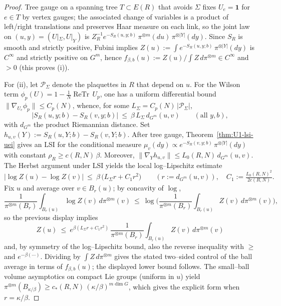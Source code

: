 \documentclass[11pt]{amsart}
\theoremstyle{plain}
\theoremstyle{definition}
\theoremstyle{remark}
\begin{document}
\begin{proof}
Tree gauge on a spanning tree $T\subset E(R)$ that avoids $\Sigma$ fixes $U_e=\mathbf 1$ for $e\in T$ by vertex gauges; the associated change of variables is a product of left/right translations and preserves Haar measure on each link, so the joint law on $(u,y)=(U|_{\Sigma},U|_Y)$ is $Z_R^{-1}e^{-S_R(u,y;b)}\,\pi^{\otimes m}(du)\,\pi^{\otimes |Y|}(dy)$. Since $S_R$ is smooth and strictly positive, Fubini implies $Z(u):=\int e^{-S_R(u,y;b)}\,\pi^{\otimes |Y|}(dy)$ is $C^\infty$ and strictly positive on $G^m$, hence $f_{\beta,b}(u):=Z(u)/\int Z\,d\pi^{\otimes m}\in C^\infty$ and $>0$ (this proves (i)).

For (ii), let $\mathcal P_\Sigma$ denote the plaquettes in $R$ that depend on $u$. For the Wilson term $\phi_p(U)=1-\tfrac1N\operatorname{ReTr}\,U_p$, one has a uniform differential bound $\|\nabla_{U_e}\phi_p\|\le C_p(N)$, whence, for some $L_\Sigma=C_p(N)\,|\mathcal P_\Sigma|$,
\[
  |S_R(u,y;b)-S_R(v,y;b)|\ \le\ \beta\,L_\Sigma\, d_{G^m}(u,v)\qquad(\text{all }y,b),
\]
with $d_{G^m}$ the product Riemannian distance. Set $h_{u,v}(Y):=S_R(u,Y;b)-S_R(v,Y;b)$. After tree gauge, Theorem~\ref{thm:U1-lsi-uei} gives an LSI for the conditional measure $\mu_v(dy)\propto e^{-S_R(v,y;b)}\,\pi^{\otimes |Y|}(dy)$ with constant $\rho_R\ge c(R,N)\,\beta$. Moreover, $\|\nabla_Y h_{u,v}\|\le L_0(R,N)\, d_{G^m}(u,v)$. The Herbst argument under LSI yields the local log--Lipschitz estimate
\[
  \big|\log Z(u)-\log Z(v)\big|\ \le\ \beta\,\big(L_\Sigma r + C_1 r^2\big)\qquad(r:=d_{G^m}(u,v)),\quad C_1:=\tfrac{L_0(R,N)^2}{2c(R,N)}.
\]
Fix $u$ and average over $v\in B_r(u)$; by concavity of $\log$,
\[
  \frac{1}{\pi^{\otimes m}(B_r)}\int_{B_r(u)}\! \log Z(v)\,d\pi^{\otimes m}(v)\ \le\ \log\Big(\frac{1}{\pi^{\otimes m}(B_r)}\int_{B_r(u)}\! Z(v)\,d\pi^{\otimes m}(v)\Big),
\]
so the previous display implies
\[
  Z(u)\ \le\ e^{\beta(L_\Sigma r + C_1 r^2)}\,\frac{1}{\pi^{\otimes m}(B_r)}\int_{B_r(u)} Z(v)\,d\pi^{\otimes m}(v)
\]
and, by symmetry of the log--Lipschitz bound, also the reverse inequality with $\ge$ and $e^{-\beta(\cdots)}$. Dividing by $\int Z\,d\pi^{\otimes m}$ gives the stated two--sided control of the ball average in terms of $f_{\beta,b}(u)$; the displayed lower bound follows. The small--ball volume asymptotics on compact Lie groups (uniform in $u$) yield $\pi^{\otimes m}(B_{\kappa/\beta})\ge c_*(R,N)\, (\kappa/\beta)^{m\dim G}$, which gives the explicit form when $r=\kappa/\beta$.
\end{proof}
\end{document}
